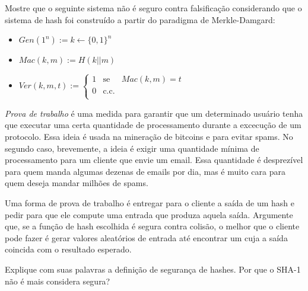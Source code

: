 \begin{exercicio}
  Mostre que o seguinte sistema não é seguro contra falsificação considerando que o sistema de hash foi construído a partir do paradigma de Merkle-Damgard:
\begin{itemize}
\item $Gen(1^n) := k \leftarrow \{0,1\}^n$
\item $Mac(k,m) := H(k||m)$
\item $Ver(k,m,t) := \left\{
    \begin{array}{lcl}
      1 & \textrm{se} & Mac(k,m) = t\\
      0 & \textrm{c.c.} &\\
    \end{array}
    \right.$ 
\end{itemize}
\end{exercicio}

\begin{exercicio}
  {\em Prova de trabalho} é uma medida para garantir que um determinado usuário tenha que executar uma certa quantidade de processamento durante a excecução de um protocolo.
  Essa ideia é usada na mineração de bitcoins e para evitar spams.
  No segundo caso, brevemente, a ideia é exigir uma quantidade mínima de processamento para um cliente que envie um email.
  Essa quantidade é desprezível para quem manda algumas dezenas de emails por dia, mas é muito cara para quem deseja mandar milhões de spams.

  Uma forma de prova de trabalho é entregar para o cliente a saída de um hash e pedir para que ele compute uma entrada que produza aquela saída.
  Argumente que, se a função de hash escolhida é segura contra colisão, o melhor que o cliente pode fazer é gerar valores aleatórios de entrada até encontrar um cuja a saída coincida com o resultado esperado.
\end{exercicio}

\begin{exercicio}
  Explique com suas palavras a definição de segurança de hashes.
  Por que o SHA-1 não é mais considera segura?
\end{exercicio}



